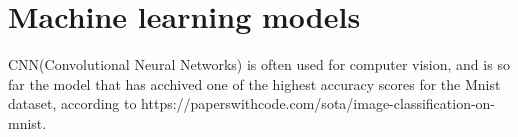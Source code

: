 \section{Machine learning models}\label{sec:machine-learning-models}





CNN(Convolutional Neural Networks) is often used for computer vision, and is so far the model that has acchived one of the highest accuracy scores for the Mnist dataset, according to https://paperswithcode.com/sota/image-classification-on-mnist.


